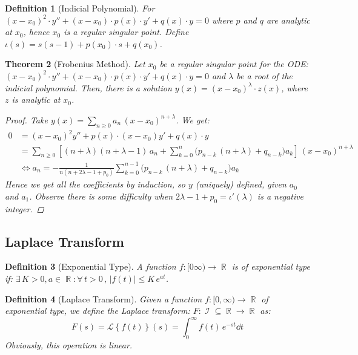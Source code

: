 \documentclass[12pt]{article}
\newcommand{\Forall}[1]{\forall\,{#1}\,,\,}
\newcommand{\Exist}[1]{\exists\,{#1}:}
\DeclareMathOperator{\R}{\mathbb{R}}
\DeclareMathOperator{\I}{\mathcal{I}}
\newcommand{\Lapl}[2][s]{\mathcal{L}\left\{#2\right\}(#1)}
\newtheorem{theorem}{Theorem}[subsection]
\newtheorem{definition}[theorem]{Definition}
\begin{document}
\begin{definition}[Indicial Polynomial]
  For $(x-x_0)^2\cdot y''+(x-x_0)\cdot p(x)\cdot y'+q(x)\cdot y=0$ where $p$ and $q$ are analytic at $x_0$, hence $x_0$ is a regular singular point. Define $\iota(s)=s(s-1)+p(x_0)\cdot s+q(x_0)$.
\end{definition}

\begin{theorem}[Frobenius Method]
  Let $x_0$ be a regular singular point for the ODE: $(x-x_0)^2\cdot y''+(x-x_0)\cdot p(x)\cdot y'+q(x)\cdot y=0$ and $\lambda$ be a root of the indicial polynomial. Then, there is a solution $y(x)=(x-x_0)^\lambda\cdot z(x)$, where $z$ is analytic at $x_0$.
  \begin{proof}
    Take $y(x)=\sum_{n\geq 0}a_n\,(x-x_0)^{n+\lambda}$. We get:
    \begin{align*}
      0&=(x-x_0)^2y''+p(x)\cdot (x-x_0)y'+q(x)\cdot y\\
      &=\sum_{n\geq 0} \left[(n+\lambda)(n+\lambda-1)\,a_n+\sum_{k=0}^n\Big(p_{n-k}\,(n+\lambda)+q_{n-k}\Big)a_k\right]\,(x-x_0)^{n+\lambda}\\
      &\Leftrightarrow a_n=-\frac{1}{n(n+2\lambda-1+p_0)}\sum_{k=0}^{n-1}\Big(p_{n-k}\,(n+\lambda)+q_{n-k}\Big)a_k
    \end{align*}
    Hence we get all the coefficients by induction, so $y$ (uniquely) defined, given $a_0$ and $a_1$. Observe there is some difficulty when $2\lambda-1+p_0=\iota'(\lambda)$ is a negative integer.
  \end{proof}
\end{theorem}

\pagebreak

\subsection{Laplace Transform}

\begin{definition}[Exponential Type]
  A function $f:[0\infty)\to\R$ is of exponential type if: $\Exist{K>0,a\in\R}\Forall{t>0}|f(t)|\leq K\,e^{at}$.
\end{definition}

\begin{definition}[Laplace Transform]
  Given a function $f:[0,\infty)\to\R$ of exponential type, we define the Laplace transform: $F:\I\subseteq\R\to\R$ as:
  $$F(s)=\Lapl{f(t)}=\int_0^\infty f(t)\,e^{-st}\dd{t}$$ Obviously, this operation is linear.
\end{definition}
\end{document}
